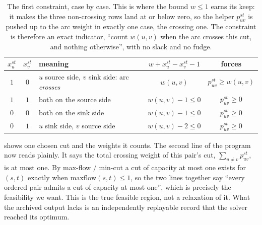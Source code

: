 \begin{table}[ht]
\centering
\begin{tabular}{cclcc}
\toprule
$x^{st}_u$ & $x^{st}_v$ & meaning & $w + x^{st}_u - x^{st}_v - 1$ & forces \\
\midrule
$1$ & $0$ & $u$ source side, $v$ sink side: arc \emph{crosses} & $w(u,v)$ & $p^{st}_{uv} \ge w(u,v)$ \\
$1$ & $1$ & both on the source side & $w(u,v) - 1 \le 0$ & $p^{st}_{uv} \ge 0$ \\
$0$ & $0$ & both on the sink side & $w(u,v) - 1 \le 0$ & $p^{st}_{uv} \ge 0$ \\
$0$ & $1$ & $u$ sink side, $v$ source side & $w(u,v) - 2 \le 0$ & $p^{st}_{uv} \ge 0$ \\
\bottomrule
\end{tabular}
\caption{The first constraint, case by case. This is where the bound $w \le 1$ earns its keep: it makes the three non-crossing rows land at or below zero, so the helper $p^{st}_{uv}$ is pushed up to the arc weight in exactly one case, the crossing one. The constraint is therefore an exact indicator, ``count $w(u,v)$ when the arc crosses this cut, and nothing otherwise'', with no slack and no fudge.}
\label{tab:crossing-cases}
\end{table}

 shows one chosen cut and the weights it counts. The second line of the program now reads plainly. It says the total crossing weight of this pair's cut, $\sum_{u \ne v} p^{st}_{uv}$, is at most one. By max-flow / min-cut a cut of capacity at most one exists for $(s,t)$ exactly when $\mathrm{maxflow}(s,t) \le 1$, so the two lines together say ``every ordered pair admits a cut of capacity at most one'', which is precisely the feasibility we want. This is the true feasible region, not a relaxation of it. What the archived output lacks is an independently replayable record that the solver reached its optimum.

